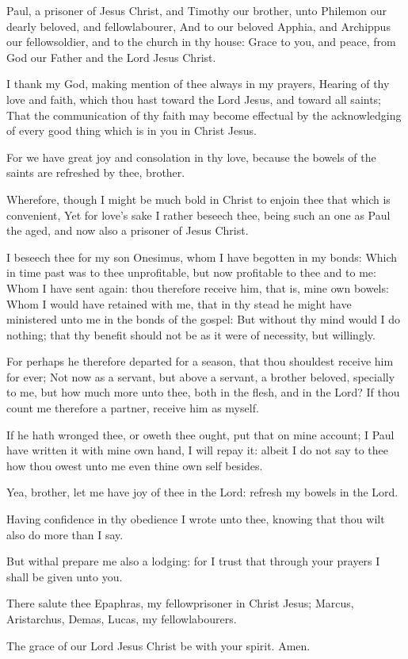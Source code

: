 \Chapter
\Verse Paul, a prisoner of Jesus Christ, and Timothy our brother, unto Philemon our dearly beloved, and fellowlabourer, \Verse And to our beloved Apphia, and Archippus our fellowsoldier, and to the church in thy house: \Verse Grace to you, and peace, from God our Father and the Lord Jesus Christ.

\Verse I thank my God, making mention of thee always in my prayers, \Verse Hearing of thy love and faith, which thou hast toward the Lord Jesus, and toward all saints; \Verse That the communication of thy faith may become effectual by the acknowledging of every good thing which is in you in Christ Jesus.

\Verse For we have great joy and consolation in thy love, because the bowels of the saints are refreshed by thee, brother.

\Verse Wherefore, though I might be much bold in Christ to enjoin thee that which is convenient, \Verse Yet for love's sake I rather beseech thee, being such an one as Paul the aged, and now also a prisoner of Jesus Christ.

\Verse I beseech thee for my son Onesimus, whom I have begotten in my bonds: \Verse Which in time past was to thee unprofitable, but now profitable to thee and to me: \Verse Whom I have sent again: thou therefore receive him, that is, mine own bowels: \Verse Whom I would have retained with me, that in thy stead he might have ministered unto me in the bonds of the gospel: \Verse But without thy mind would I do nothing; that thy benefit should not be as it were of necessity, but willingly.

\Verse For perhaps he therefore departed for a season, that thou shouldest receive him for ever; \Verse Not now as a servant, but above a servant, a brother beloved, specially to me, but how much more unto thee, both in the flesh, and in the Lord?  \Verse If thou count me therefore a partner, receive him as myself.

\Verse If he hath wronged thee, or oweth thee ought, put that on mine account; \Verse I Paul have written it with mine own hand, I will repay it: albeit I do not say to thee how thou owest unto me even thine own self besides.

\Verse Yea, brother, let me have joy of thee in the Lord: refresh my bowels in the Lord.

\Verse Having confidence in thy obedience I wrote unto thee, knowing that thou wilt also do more than I say.

\Verse But withal prepare me also a lodging: for I trust that through your prayers I shall be given unto you.

\Verse There salute thee Epaphras, my fellowprisoner in Christ Jesus; \Verse Marcus, Aristarchus, Demas, Lucas, my fellowlabourers.

\Verse The grace of our Lord Jesus Christ be with your spirit. Amen.

